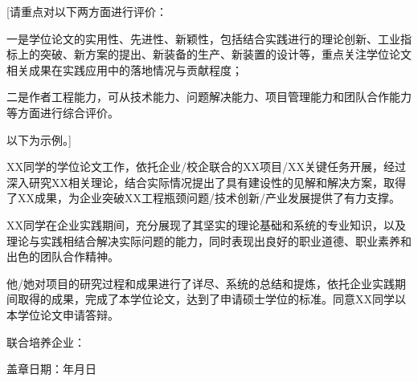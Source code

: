 [请重点对以下两方面进行评价：

一是学位论文的实用性、先进性、新颖性，包括结合实践进行的理论创新、工业指标上的突破、新方案的提出、新装备的生产、新装置的设计等，重点关注学位论文相关成果在实践应用中的落地情况与贡献程度；

二是作者工程能力，可从技术能力、问题解决能力、项目管理能力和团队合作能力等方面进行综合评价。

以下为示例。]

XX同学的学位论文工作，依托企业/校企联合的XX项目/XX关键任务开展，经过深入研究XX相关理论，结合实际情况提出了具有建设性的见解和解决方案，取得了XX成果，为企业突破XX工程瓶颈问题/技术创新/产业发展提供了有力支撑。

XX同学在企业实践期间，充分展现了其坚实的理论基础和系统的专业知识，以及理论与实践相结合解决实际问题的能力，同时表现出良好的职业道德、职业素养和出色的团队合作精神。

他/她对项目的研究过程和成果进行了详尽、系统的总结和提炼，依托企业实践期间取得的成果，完成了本学位论文，达到了申请硕士学位的标准。同意XX同学以本学位论文申请答辩。

\vspace{6ex}

\hfill\begin{minipage}[t]{0.5\textwidth}
联合培养企业：

盖章日期：\hspace{4\ccwd}年\hspace{2\ccwd}月\hspace{2\ccwd}日
\end{minipage}
